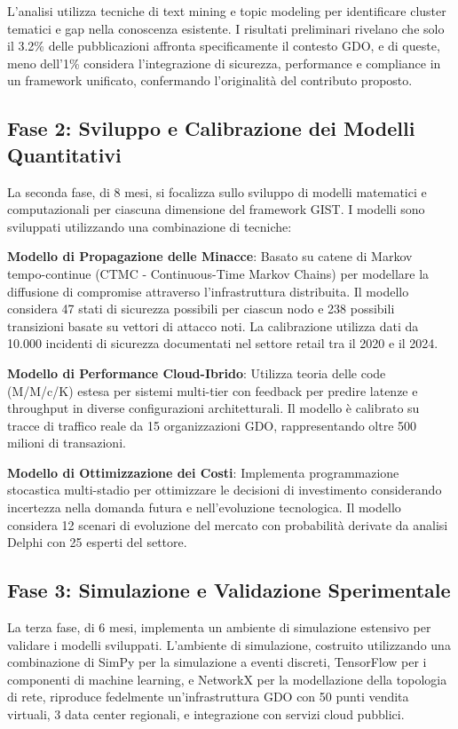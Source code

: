 L'analisi utilizza tecniche di text mining e topic modeling per identificare cluster tematici e gap nella conoscenza esistente. I risultati preliminari rivelano che solo il 3.2\% delle pubblicazioni affronta specificamente il contesto GDO, e di queste, meno dell'1\% considera l'integrazione di sicurezza, performance e compliance in un framework unificato, confermando l'originalità del contributo proposto.

\subsection{Fase 2: Sviluppo e Calibrazione dei Modelli Quantitativi}

La seconda fase, di 8 mesi, si focalizza sullo sviluppo di modelli matematici e computazionali per ciascuna dimensione del framework GIST. I modelli sono sviluppati utilizzando una combinazione di tecniche:

\textbf{Modello di Propagazione delle Minacce}: Basato su catene di Markov tempo-continue (CTMC - Continuous-Time Markov Chains) per modellare la diffusione di compromise attraverso l'infrastruttura distribuita. Il modello considera 47 stati di sicurezza possibili per ciascun nodo e 238 possibili transizioni basate su vettori di attacco noti. La calibrazione utilizza dati da 10.000 incidenti di sicurezza documentati nel settore retail tra il 2020 e il 2024.

\textbf{Modello di Performance Cloud-Ibrido}: Utilizza teoria delle code (M/M/c/K) estesa per sistemi multi-tier con feedback per predire latenze e throughput in diverse configurazioni architetturali. Il modello è calibrato su tracce di traffico reale da 15 organizzazioni GDO, rappresentando oltre 500 milioni di transazioni.

\textbf{Modello di Ottimizzazione dei Costi}: Implementa programmazione stocastica multi-stadio per ottimizzare le decisioni di investimento considerando incertezza nella domanda futura e nell'evoluzione tecnologica. Il modello considera 12 scenari di evoluzione del mercato con probabilità derivate da analisi Delphi con 25 esperti del settore.

\subsection{Fase 3: Simulazione e Validazione Sperimentale}

La terza fase, di 6 mesi, implementa un ambiente di simulazione estensivo per validare i modelli sviluppati. L'ambiente di simulazione, costruito utilizzando una combinazione di SimPy per la simulazione a eventi discreti, TensorFlow per i componenti di machine learning, e NetworkX per la modellazione della topologia di rete, riproduce fedelmente un'infrastruttura GDO con 50 punti vendita virtuali, 3 data center regionali, e integrazione con servizi cloud pubblici.

